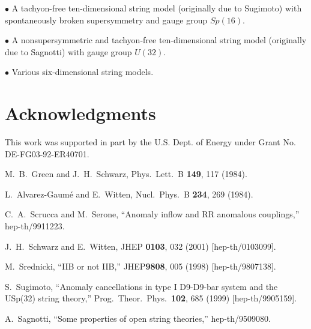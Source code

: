 \documentclass[a4paper,12pt]{article}
\begin{document}
\noindent $\bullet$ A tachyon-free ten-dimensional string model
(originally due to Sugimoto\cite{Sugimoto:1999tx}) with
spontaneously broken supersymmetry and gauge group $Sp(16)$.

\noindent $\bullet$ A nonsupersymmetric and tachyon-free
ten-dimensional string model (originally due to
Sagnotti\cite{Sagnotti:1995ga}) with gauge group $U(32)$.

\noindent $\bullet$ Various six-dimensional string models.


\section*{Acknowledgments}
This work was supported in part by the U.S. Dept. of Energy under
Grant No. DE-FG03-92-ER40701.


\begin{thebibliography}{99}

M.~B.~Green and J.~H.~Schwarz,
Phys.\ Lett.\ B {\bf 149}, 117 (1984).

L.~Alvarez-Gaum\'e and E.~Witten,
Nucl.\ Phys.\ B {\bf 234}, 269 (1984).


C.~A.~Scrucca and M.~Serone, ``Anomaly inflow and RR anomalous
couplings,'' hep-th/9911223.

J.~H.~Schwarz and E.~Witten,
JHEP {\bf 0103}, 032 (2001)
[hep-th/0103099].

M.~Srednicki, ``IIB or not IIB,'' JHEP{\bf 9808}, 005 (1998)
[hep-th/9807138].

S.~Sugimoto, ``Anomaly cancellations in type I D9-D9-bar system
and the USp(32)  string theory,'' Prog.\ Theor.\ Phys.\ {\bf 102},
685 (1999) [hep-th/9905159].

A.~Sagnotti, ``Some properties of open string theories,''
hep-th/9509080.

\end{thebibliography}
\end{document}
